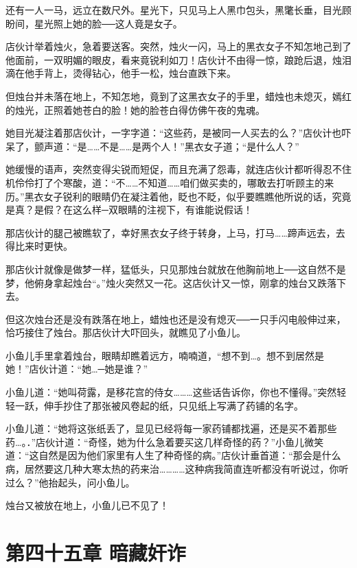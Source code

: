 \documentclass[12pt,oneside]{book}
\begin{document}
还有一人一马，远立在数尺外。星光下，只见马上人黑巾包头，黑氅长垂，目光顾盼间，星光照上她的脸──这人竟是女子。

店伙计举着烛火，急着要送客。突然，烛火一闪，马上的黑衣女子不知怎地己到了他面前，一双明媚的眼皮，看来竟锐利如刀！店伙计不由得一惊，踉跄后退，烛泪滴在他手背上，烫得钻心，他手一松，烛台直跌下来。

但烛台并未落在地上，不知怎地，竟到了这黑衣女子的手里，蜡烛也未熄灭，嫣红的烛光，正照着她苍白的脸！她的脸苍白得仿佛午夜的鬼魂。

她目光凝注着那店伙计，一字字道：``这些药，是被同一人买去的么？''店伙计也吓呆了，颤声道：``是\ldots\ldots 不是\ldots\ldots 是两个人！''黑衣女子道；``是什么人？''

她缓慢的语声，突然变得尖锐而短促，而且充满了怨毒，就连店伙计都听得忍不住机伶伶打了个寒酸，道：``不\ldots\ldots 不知道\ldots\ldots 咱们做买卖的，哪敢去打听顾主的来历。''黑衣女子锐利的眼睛仍在凝注着他，眨也不眨，似乎要瞧瞧他所说的话，究竟是真？是假？在这么样─双眼睛的注视下，有谁能说假话！

那店伙计的腿己被瞧软了，幸好黑衣女子终于转身，上马，打马\ldots\ldots 蹄声远去，去得比来时更快。

那店伙计就像是做梦一样，猛低头，只见那烛台就放在他胸前地上──这自然不是梦，他俯身拿起烛台``。''烛火突然又一花。这店伙计又一惊，刚拿的烛台又跌落下去。

但这次烛台还是没有跌落在地上，蜡烛也还是没有熄灭──一只手闪电般伸过来，恰巧接住了烛台。那店伙计大吓回头，就瞧见了小鱼儿。

小鱼儿手里拿着烛台，眼睛却瞧着远方，喃喃道，``想不到\ldots。想不到居然是她！''店伙计道：``她\ldots─她是谁？''

小鱼儿道：``她叫荷露，是移花宫的侍女\ldots\ldots\ldots 这些话告诉你，你也不懂得。''突然轻轻一跃，伸手抄住了那张被风卷起的纸，只见纸上写满了药铺的名字。

小鱼儿道：``她将这张纸丢了，显见已经将每一家药铺都找遍，还是买不着那些药\ldots。．''店伙计道：``奇怪，她为什么急着要买这几样奇怪的药？''小鱼儿微笑道：``这自然是因为他们家里有人生了种奇怪的病。''店伙计垂首道：``那会是什么病，居然要这几种大寒太热的药来治\ldots\ldots\ldots\ldots 这种病我简直连听都没有听说过，你听过么？''他抬起头，问小鱼儿。

烛台又被放在地上，小鱼儿已不见了！

\hypertarget{ux7b2cux56dbux5341ux4e94ux7ae0-ux6697ux85cfux5978ux8bc8}{%
\chapter{第四十五章
暗藏奸诈}\label{ux7b2cux56dbux5341ux4e94ux7ae0-ux6697ux85cfux5978ux8bc8}}
\end{document}
